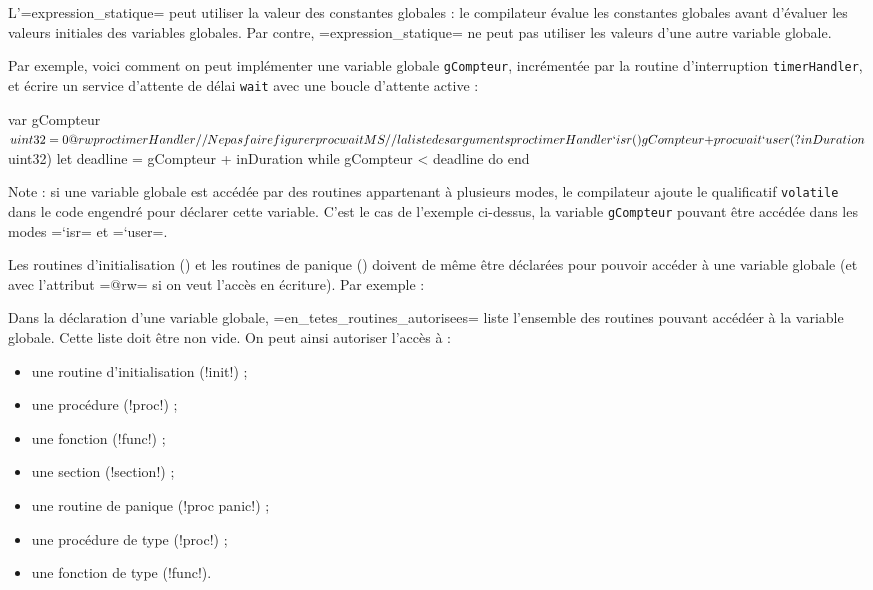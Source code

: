 L'\plm=expression_statique= peut utiliser la valeur des constantes globales : le compilateur évalue les constantes globales avant d'évaluer les valeurs initiales des variables globales. Par contre, \plm=expression_statique= ne peut pas utiliser les valeurs d'une autre variable globale.

Par exemple, voici comment on peut implémenter une variable globale \texttt{gCompteur}, incrémentée par la routine d'interruption \texttt{timerHandler}, et écrire un service d'attente de délai \texttt{wait} avec une boucle d'attente active :

\begin{PLM}
var gCompteur $uint32 = 0 {
  @rw proc timerHandler // Ne pas faire figurer
  proc waitMS           // la liste des arguments
}

proc timerHandler `isr () {
  gCompteur +%
}

proc wait `user (?inDuration $uint32) {
  let deadline = gCompteur + inDuration
  while gCompteur < deadline do
  end
}
\end{PLM}

Note : si une variable globale est accédée par des routines appartenant à plusieurs modes, le compilateur ajoute le qualificatif \texttt{volatile} dans le code engendré pour déclarer cette variable. C'est le cas de l'exemple ci-dessus, la variable \texttt{gCompteur} pouvant être accédée dans les modes \plm=`isr= et \plm=`user=.


Les routines d'initialisation () et les routines de panique ()
 doivent de même être déclarées pour pouvoir accéder à une variable globale (et avec l'attribut \plm=@rw= si on veut l'accès en écriture). Par exemple :



Dans la déclaration d'une variable globale, \plm=en_tetes_routines_autorisees= liste l'ensemble des routines pouvant accédéer à la variable globale. Cette liste doit être non vide. On peut ainsi autoriser l'accès à :
\begin{itemize}
  \item une routine d'initialisation (\plm!init!) ;
  \item une procédure (\plm!proc!) ;
  \item une fonction (\plm!func!) ;
  \item une section (\plm!section!) ;
  \item une routine de panique (\plm!proc panic!) ;
  \item une procédure de type (\plm!proc!) ;
  \item une fonction de type (\plm!func!).
\end{itemize}

